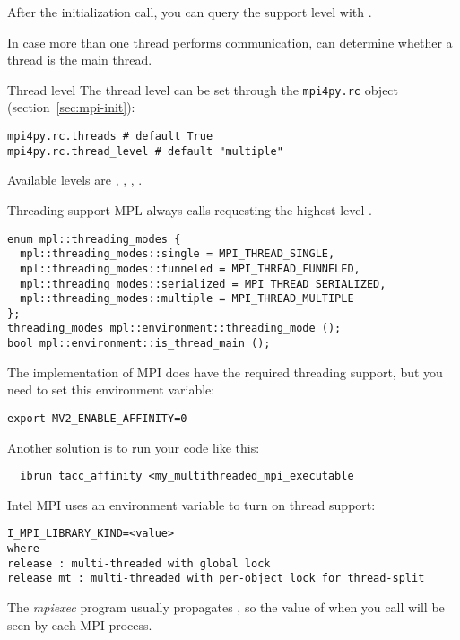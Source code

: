 After the initialization call, you can query the support level
with .

In case more than one thread performs communication, 
can determine whether a thread is the main thread.

\begin{pythonnote}{Thread level}
  The thread level can be set through the \lstinline{mpi4py.rc} object
  (section~\ref{sec:mpi-init}):
\begin{lstlisting}
mpi4py.rc.threads # default True
mpi4py.rc.thread_level # default "multiple"
\end{lstlisting}
Available levels are
, , , .
\end{pythonnote}

\begin{mplnote}{Threading support}
  \ac{MPL} always calls 
  requesting the highest level .
\begin{lstlisting}
enum mpl::threading_modes {
  mpl::threading_modes::single = MPI_THREAD_SINGLE, 
  mpl::threading_modes::funneled = MPI_THREAD_FUNNELED,
  mpl::threading_modes::serialized = MPI_THREAD_SERIALIZED,
  mpl::threading_modes::multiple = MPI_THREAD_MULTIPLE
};
threading_modes mpl::environment::threading_mode ();
bool mpl::environment::is_thread_main ();
\end{lstlisting}
\end{mplnote}

\begin{tacc}
  The  implementation of MPI
  does have the required threading support, but you need to set this environment variable:  
\begin{verbatim}
export MV2_ENABLE_AFFINITY=0
\end{verbatim}
  Another solution is to run your code like this:
\begin{verbatim}
  ibrun tacc_affinity <my_multithreaded_mpi_executable
\end{verbatim}
  Intel MPI uses an environment variable to turn on thread support:
\begin{verbatim}
I_MPI_LIBRARY_KIND=<value>
where
release : multi-threaded with global lock
release_mt : multi-threaded with per-object lock for thread-split  
\end{verbatim}
\end{tacc}

The \emph{mpiexec}
program usually propagates ,
so the value of  when you call 
will be seen by each MPI process.

